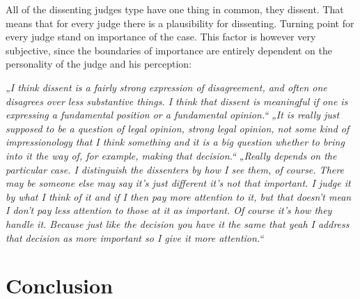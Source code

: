 \documentclass[
  11pt,
]{article}
\begin{document}
All of the dissenting judges type have one thing in common, they
dissent. That means that for every judge there is a plausibility for
dissenting. Turning point for every judge stand on importance of the
case. This factor is however very subjective, since the boundaries of
importance are entirely dependent on the personality of the judge and
his perception:

\emph{„I think dissent is a fairly strong expression of disagreement,
and often one disagrees over less substantive things. I think that
dissent is meaningful if one is expressing a fundamental position or a
fundamental opinion.``} \emph{„It is really just supposed to be a
question of legal opinion, strong legal opinion, not some kind of
impressionology that I think something and it is a big question whether
to bring into it the way of, for example, making that decision.``}
\emph{„Really depends on the particular case. I distinguish the
dissenters by how I see them, of course. There may be someone else may
say it's just different it's not that important. I judge it by what I
think of it and if I then pay more attention to it, but that doesn't
mean I don't pay less attention to those at it as important. Of course
it's how they handle it. Because just like the decision you have it the
same that yeah I address that decision as more important so I give it
more attention.``}

\hypertarget{conclusion}{%
\section{Conclusion}\label{conclusion}}
\end{document}
